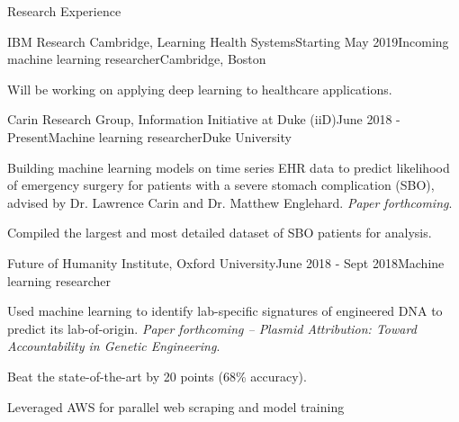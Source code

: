 \documentclass{resume} %
\begin{document}

\begin{rSection}{Research Experience}

\begin{rSubsection}{IBM Research Cambridge, Learning Health Systems}{Starting May 2019}{Incoming machine learning researcher}{Cambridge, Boston}
	\item Will be working on applying deep learning to healthcare applications.
\end{rSubsection}

\begin{rSubsection}{Carin Research Group, Information Initiative at Duke (iiD)}{June 2018 - Present}{Machine learning researcher}{Duke University}
\item Building machine learning models on time series EHR data to predict likelihood of emergency surgery for patients with a severe stomach complication (SBO), advised by Dr. Lawrence Carin and Dr. Matthew Englehard. \textit{Paper forthcoming}.
\item Compiled the largest and most detailed dataset of SBO patients for analysis.
\end{rSubsection}

\begin{rSubsection}{Future of Humanity Institute, Oxford University}{June 2018 - Sept 2018}{Machine learning researcher}{}
\item Used machine learning to identify lab-specific signatures of engineered DNA to predict its lab-of-origin. \textit{Paper forthcoming -- Plasmid Attribution: Toward Accountability in Genetic Engineering}.
\item Beat the state-of-the-art by 20 points (68\% accuracy).
\item Leveraged AWS for parallel web scraping and model training
\end{rSubsection}


\end{rSection}
\end{document}
